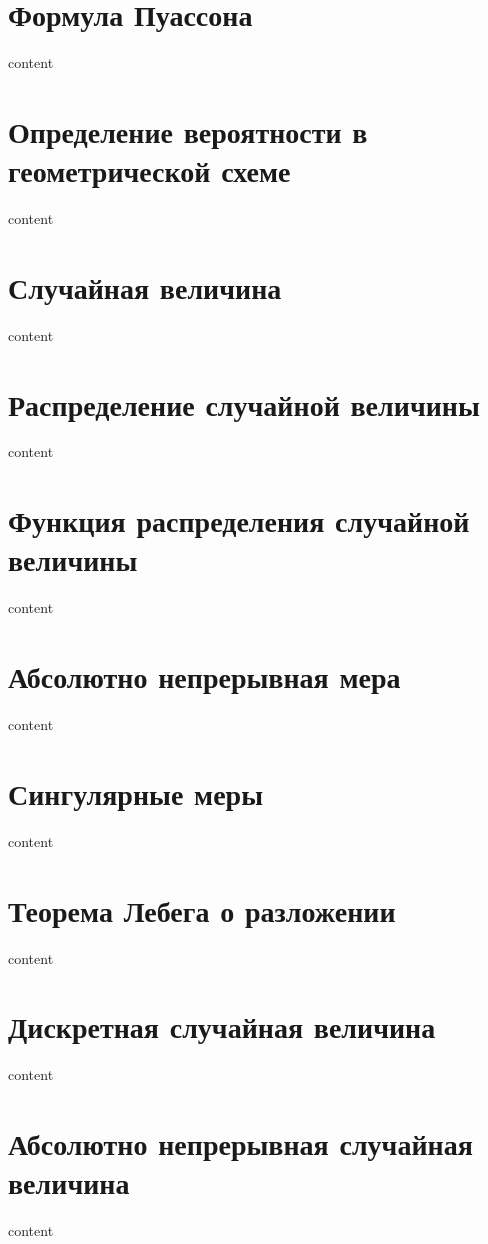 \section{Формула Пуассона}

content

\section{Определение вероятности в геометрической схеме}

content

\section{Случайная величина}

content

\section{Распределение случайной величины}

content

\section{Функция распределения случайной величины}

content

\section{Абсолютно непрерывная мера}

content

\section{Сингулярные меры}

content

\section{Теорема Лебега о разложении}

content

\section{Дискретная случайная величина}

content

\section{Абсолютно непрерывная случайная величина}

content
